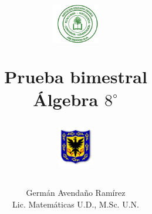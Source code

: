 \documentclass[10pt,letterpaper,addpoints]{exam}
\begin{document}
\title{\begin{minipage}{.2\textwidth}
        \includegraphics[height=1.75cm]{Images/logo-colegio.png}
       \end{minipage}
\begin{minipage}{.55\textwidth}
 \begin{center}
Prueba bimestral \\Álgebra $8^{\circ}$
\end{center}
\end{minipage}
\begin{minipage}{.2\textwidth}
\includegraphics[height=1.75cm]{Images/logo-sed.png} 
\end{minipage}
}
\author{Germ\'{a}n Avendaño Ram\'{i}rez\\Lic. Matemáticas U.D., M.Sc. U.N.}
\date{}
\maketitle
\begin{center}
\end{center}
\vspace{0.1in}
\end{document}

